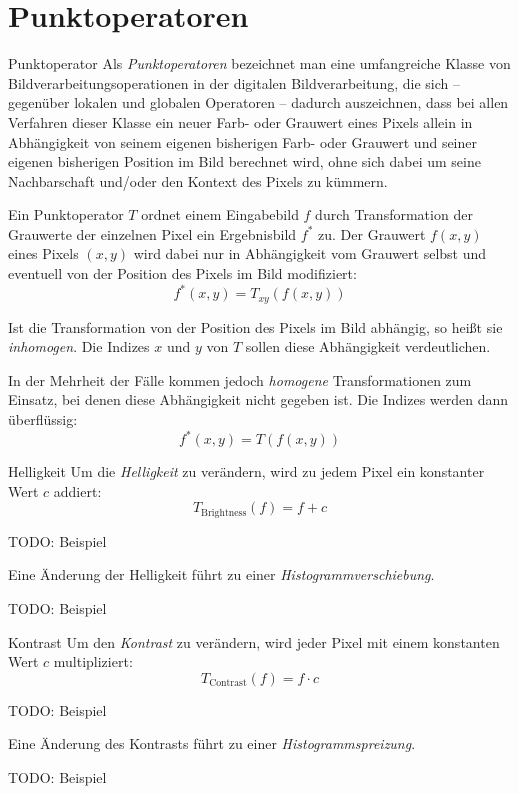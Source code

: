 \section{Punktoperatoren}

\begin{defi}{Punktoperator}
    Als \emph{Punktoperatoren} bezeichnet man eine umfangreiche Klasse von Bildverarbeitungsoperationen in der digitalen Bildverarbeitung, die sich -- gegenüber lokalen und globalen Operatoren -- dadurch auszeichnen, dass bei allen Verfahren dieser Klasse ein neuer Farb- oder Grauwert eines Pixels allein in Abhängigkeit von seinem eigenen bisherigen Farb- oder Grauwert und seiner eigenen bisherigen Position im Bild berechnet wird, ohne sich dabei um seine Nachbarschaft und/oder den Kontext des Pixels zu kümmern.

    Ein Punktoperator $T$ ordnet einem Eingabebild $f$ durch Transformation der Grauwerte der einzelnen Pixel ein Ergebnisbild $f^*$ zu.
    Der Grauwert $f(x,y)$ eines Pixels $(x,y)$ wird dabei nur in Abhängigkeit vom Grauwert selbst und eventuell von der Position des Pixels im Bild modifiziert:
    \[
        f^*(x, y) = T_{xy}(f(x, y))
    \]

    Ist die Transformation von der Position des Pixels im Bild abhängig, so heißt sie \emph{inhomogen}.
    Die Indizes $x$ und $y$ von $T$ sollen diese Abhängigkeit verdeutlichen.

    In der Mehrheit der Fälle kommen jedoch \emph{homogene} Transformationen zum Einsatz, bei denen diese Abhängigkeit nicht gegeben ist.
    Die Indizes werden dann überflüssig:
    \[
        f^*(x, y) = T(f(x, y))
    \]
\end{defi}

\begin{defi}{Helligkeit}
    Um die \emph{Helligkeit} zu verändern, wird zu jedem Pixel ein konstanter Wert $c$ addiert:
    \[
        T_{\text{Brightness}}(f) = f + c
    \]

    TODO: Beispiel

    Eine Änderung der Helligkeit führt zu einer \emph{Histogrammverschiebung}.

    TODO: Beispiel
\end{defi}

\begin{defi}{Kontrast}
    Um den \emph{Kontrast} zu verändern, wird jeder Pixel mit einem konstanten Wert $c$ multipliziert:
    \[
        T_{\text{Contrast}}(f) = f \cdot c
    \]

    TODO: Beispiel

    Eine Änderung des Kontrasts führt zu einer \emph{Histogrammspreizung}.

    TODO: Beispiel
\end{defi}

